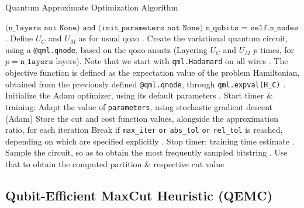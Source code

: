 \begin{algorithm}[H]
   \caption{Quantum Approximate Optimization Algorithm}\label{alg:QAOA}
   \begin{algorithmic}
   \Require $\texttt{(n\_layers not None) and (init_parameters not None)}$
   \Ensure $\texttt{n\_qubits = self.n\_nodes}$
   . Define $U_C$ and $U_M$ as for usual \acrshort{qoao}
   . Create the variational quantum circuit, using a \texttt{@qml.qnode}, based on the \acrshort{qoao} ansatz (Layering $U_C$ and $U_M$ $p$ times, for $p = \texttt{n\_layers}$ layers). Note that we start with \texttt{qml.Hadamard} on all wires
   . The objective function is defined as the expectation value of the problem Hamiltonian, obtained from the previously defined \texttt{@qml.qnode}, through \texttt{qml.expval(H_C)}
   . Initialize the Adam optimizer, using its default parameters
   . Start timer \& training:
    Adapt the value of \texttt{parameters}, using stochastic gradient descent (Adam)
    Store the cut and cost function values, alongside the approximation ratio, for each iteration
    Break if \texttt{max\_iter} \texttt{or} \texttt{abs\_tol} \texttt{or} \texttt{rel\_tol} is reached, depending on which are specified explicitly
   \EndWhile
   . Stop timer: training time estimate
   . Sample the circuit, so as to obtain the most frequently sampled bitstring
   . Use that to obtain the computed partition \& respective cut value
   \end{algorithmic}
\end{algorithm}

\subsection{Qubit-Efficient MaxCut Heuristic (QEMC)}
\label{subsection:QEMC_Implementation}


